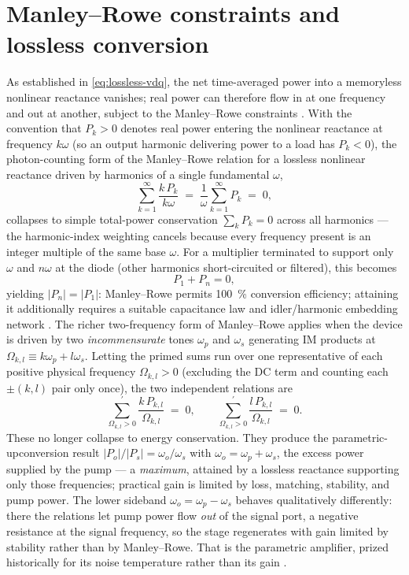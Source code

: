 \documentclass[12pt]{article}
\begin{document}
\section*{Manley--Rowe constraints and lossless conversion}

As established in \eqref{eq:lossless-vdq}, the net time-averaged power into a memoryless nonlinear reactance vanishes; real power can therefore flow in at one frequency and out at another, subject to the Manley--Rowe constraints \cite{manleyrowe}. With the convention that $P_k > 0$ denotes real power entering the nonlinear reactance at frequency $k\omega$ (so an output harmonic delivering power to a load has $P_k < 0$), the photon-counting form of the Manley--Rowe relation for a lossless nonlinear reactance driven by harmonics of a single fundamental $\omega$,
\begin{equation}
\sum_{k=1}^{\infty} \frac{k\, P_k}{k\omega} \;=\; \frac{1}{\omega}\sum_{k=1}^{\infty} P_k \;=\; 0,
\label{eq:mr-multiplier}
\end{equation}
collapses to simple total-power conservation $\sum_k P_k = 0$ across all harmonics --- the harmonic-index weighting cancels because every frequency present is an integer multiple of the same base $\omega$. For a multiplier terminated to support only $\omega$ and $n\omega$ at the diode (other harmonics short-circuited or filtered), this becomes
\begin{equation}
P_1 + P_n = 0,
\label{eq:mr-100percent}
\end{equation}
yielding $|P_n| = |P_1|$: Manley--Rowe permits \SI{100}{\percent} conversion efficiency; attaining it additionally requires a suitable capacitance law and idler/harmonic embedding network \cite{penfieldrafuse}. The richer two-frequency form of Manley--Rowe applies when the device is driven by two \emph{incommensurate} tones $\omega_p$ and $\omega_s$ generating IM products at $\Omega_{k,l} \equiv k\omega_p + l\omega_s$. Letting the primed sums run over one representative of each positive physical frequency $\Omega_{k,l} > 0$ (excluding the DC term and counting each $\pm(k,l)$ pair only once), the two independent relations are
\begin{equation}
\sum_{\Omega_{k,l}>0}^{\prime} \frac{k\, P_{k,l}}{\Omega_{k,l}} \;=\; 0,
\qquad
\sum_{\Omega_{k,l}>0}^{\prime} \frac{l\, P_{k,l}}{\Omega_{k,l}} \;=\; 0.
\label{eq:mr-two-tone}
\end{equation}
These no longer collapse to energy conservation. They produce the parametric-upconversion result $|P_o|/|P_s| = \omega_o/\omega_s$ with $\omega_o = \omega_p + \omega_s$, the excess power supplied by the pump --- a \emph{maximum}, attained by a lossless reactance supporting only those frequencies; practical gain is limited by loss, matching, stability, and pump power. The lower sideband $\omega_o = \omega_p - \omega_s$ behaves qualitatively differently: there the relations let pump power flow \emph{out} of the signal port, a negative resistance at the signal frequency, so the stage regenerates with gain limited by stability rather than by Manley--Rowe. That is the parametric amplifier, prized historically for its noise temperature rather than its gain \cite{manleyrowe,penfieldrafuse}.
\end{document}
